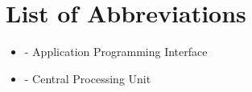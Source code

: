 \chapter*{List of Abbreviations}

\begin{itemize}[
    align=left,
    labelwidth=1.5cm,
    labelindent=0pt,
    leftmargin=!,
    labelsep=0.5cm,
    noitemsep, topsep=0pt, parsep=0pt, partopsep=0pt
]
\item[API] - Application Programming Interface
\item[CPU] - Central Processing Unit
\end{itemize}

